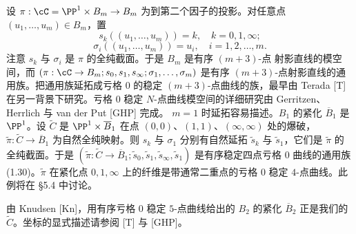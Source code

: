 设 $\pi:\cC=\PP^1\times B_m\to B_m$ 为到第二个因子的投影。对任意点
$(u_1,\dots,u_m)\in B_m$，置
\[
s_k((u_1,\dots,u_m))=k,\quad k=0,1,\infty;
\]
\[
\sigma_i((u_1,\dots,u_m))=u_i,\quad i=1,2,\dots,m .
\]
注意 $s_k$ 与 $\sigma_i$ 是 $\pi$ 的全纯截面。于是 $B_m$ 是有序 $(m+3)$-点
射影直线的模空间，而 $(\pi:\cC\to B_m;s_0,s_1,s_\infty;\sigma_1,\dots,\sigma_m)$
是有序 $(m+3)$-点射影直线的通用族。把通用族延拓成亏格 $0$ 的稳定
$(m+3)$-点曲线的族，最早由 Terada [T] 在另一背景下研究。亏格 $0$ 稳定
$N$-点曲线模空间的详细研究由 Gerritzen、Herrlich 与 van der Put [GHP] 完成。
$m=1$ 时延拓容易描述。$B_1$ 的紧化 $\overline{B}_1$ 是 $\PP^1$。设
$\tilde C$ 是 $\PP^1\times\overline{B}_1$ 在点 $(0,0)$、$(1,1)$、$(\infty,\infty)$
处的爆破，$\tilde\pi:\tilde C\to\overline{B}_1$ 为自然全纯映射。则 $s_k$ 与
$\sigma_1$ 分别有自然延拓 $\tilde s_k$ 与 $\tilde s_1$，它们是 $\tilde\pi$ 的
全纯截面。于是
$(\tilde\pi:\tilde C\to\overline{B}_1;\tilde s_0,\tilde s_1,\tilde s_\infty,\tilde s_1)$
是有序稳定四点亏格 $0$ 曲线的通用族 (1.30)。$\tilde\pi$ 在紧化点 $0,1,\infty$
上的纤维是带通常二重点的亏格 $0$ 稳定 $4$-点曲线。此例将在 §5.4 中讨论。

由 Knudsen [Kn]，用有序亏格 $0$ 稳定 $5$-点曲线给出的 $B_2$ 的紧化
$\overline{B}_2$ 正是我们的 $\tilde C$。坐标的显式描述请参阅 [T] 与 [GHP]。
